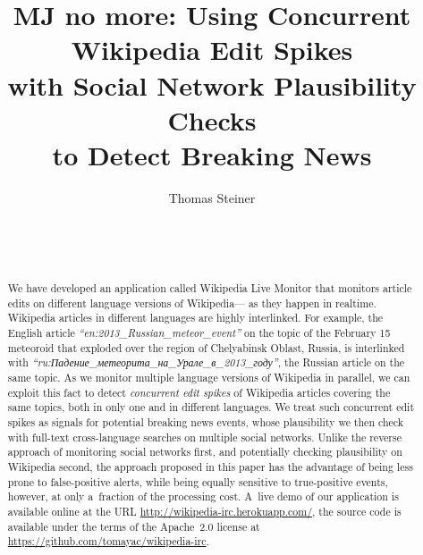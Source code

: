 \documentclass{sig-alternate}
\newcommand{\inlinelistingsize}{\fontsize{8pt}{11pt}}
\let\oldurl\url
\renewcommand{\url}[1]{\inlinelistingsize\oldurl{#1}}
\begin{document}


\title{MJ no more: Using Concurrent Wikipedia Edit Spikes\\ with Social Network Plausibility Checks\\ to Detect Breaking News}

\author{
\alignauthor
Thomas Steiner\\
	\\
	\\
	\\
}
\maketitle
\begin{abstract}
\selectfont
We have developed an application called Wikipedia Live Monitor
that monitors article edits on different language versions of Wikipedia---%
as they happen in realtime.
Wikipedia articles in different languages are highly interlinked.
For example, the English article \emph{``en:2013\_Russian\_meteor\_event''}
on the topic of the February 15 meteoroid
that exploded over the region of Chelyabinsk Oblast, Russia,
is interlinked with \selectfont
\emph{``ru:Падение\_метеорита\_на\_Урале\_в\_2013\_году''},
\selectfont
the Russian article on the same topic.
As we monitor multiple language versions of Wikipedia in parallel,
we can exploit this fact to detect \emph{concurrent edit spikes}
of Wikipedia articles covering the same topics,
both in only one and in different languages.
We treat such concurrent edit spikes as signals
for potential breaking news events, whose plausibility we then check 
with full-text cross-language searches on multiple social networks.
Unlike the reverse approach of monitoring social networks first,
and potentially checking plausibility on Wikipedia second,
the approach proposed in this paper has the advantage of
being less prone to false-positive alerts, while being equally sensitive
to true-positive events, however, at only a~fraction of the processing cost.
A~live demo of our application is available online at the URL \url{http://wikipedia-irc.herokuapp.com/},
the source code is available
under the terms of the Apache~2.0 license at 
\url{https://github.com/tomayac/wikipedia-irc}.

\end{abstract}
\end{document}
